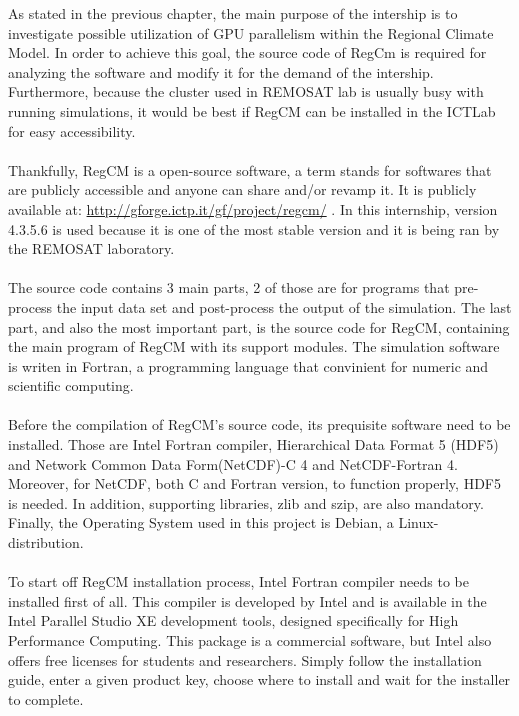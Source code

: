 As stated in the previous chapter, the main purpose of the intership is to investigate possible utilization of GPU parallelism within the Regional Climate Model. In order to achieve this goal, the source code of RegCm is required for analyzing the software and modify it for the demand of the intership. Furthermore, because the cluster used in REMOSAT lab is usually busy with running simulations, it would be best if RegCM can be installed in the ICTLab for easy accessibility. \\
~\\
Thankfully, RegCM is a open-source software, a term stands for softwares that are publicly accessible and anyone can share and/or revamp it. It is publicly available at: \url{http://gforge.ictp.it/gf/project/regcm/} . In this internship, version 4.3.5.6 is used because it is one of the most stable version and it is being ran by the REMOSAT laboratory. \\
~\\
The source code contains 3 main parts, 2 of those are for programs that pre-process the input data set and post-process the output of the simulation. The last part, and also the most important part, is the source code for RegCM, containing the main program of RegCM with its support modules. The simulation software is writen in Fortran, a programming language that convinient for numeric and scientific computing. \\
~\\
Before the compilation of RegCM's source code, its prequisite software need to be installed. Those are Intel Fortran compiler, Hierarchical Data Format 5 (HDF5) and Network Common Data Form(NetCDF)-C 4 and NetCDF-Fortran 4. Moreover, for NetCDF, both C and Fortran version, to function properly, HDF5 is needed. In addition, supporting libraries, zlib and szip, are also mandatory. Finally, the Operating System used in this project is Debian, a Linux-distribution. \\
~\\
To start off RegCM installation process, Intel Fortran compiler needs to be installed first of all. This compiler is developed by Intel and is available in the Intel Parallel Studio XE development tools, designed specifically for High Performance Computing. This package is a commercial software, but Intel also offers free licenses for students and researchers. Simply follow the installation guide, enter a given product key, choose where to install and wait for the installer to complete. \\
~\\
